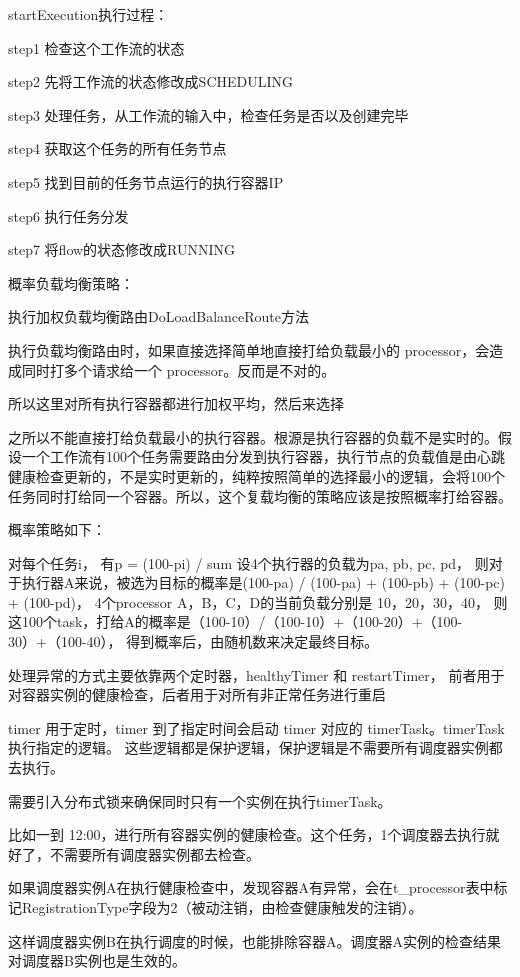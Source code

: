 startExecution执行过程：

step1 检查这个工作流的状态

step2 先将工作流的状态修改成SCHEDULING

step3 处理任务，从工作流的输入中，检查任务是否以及创建完毕

step4 获取这个任务的所有任务节点

step5 找到目前的任务节点运行的执行容器IP

step6 执行任务分发

step7 将flow的状态修改成RUNNING

概率负载均衡策略：

执行加权负载均衡路由DoLoadBalanceRoute方法

执行负载均衡路由时，如果直接选择简单地直接打给负载最小的 processor，会造成同时打多个请求给一个 processor。反而是不对的。

所以这里对所有执行容器都进行加权平均，然后来选择

之所以不能直接打给负载最小的执行容器。根源是执行容器的负载不是实时的。假设一个工作流有100个任务需要路由分发到执行容器，执行节点的负载值是由心跳
健康检查更新的，不是实时更新的，纯粹按照简单的选择最小的逻辑，会将100个任务同时打给同一个容器。所以，这个复载均衡的策略应该是按照概率打给容器。

概率策略如下：

对每个任务i， 有p = (100-pi) / sum
设4个执行器的负载为pa, pb, pc, pd，
则对于执行器A来说，被选为目标的概率是(100-pa) / (100-pa) + (100-pb) + (100-pc) + (100-pd)，
4个processor A，B，C，D的当前负载分别是 10，20，30，40，
则这100个task，打给A的概率是（100-10）/（100-10）+（100-20）+（100-30）+（100-40），
得到概率后，由随机数来决定最终目标。

处理异常的方式主要依靠两个定时器，healthyTimer 和 restartTimer，
前者用于对容器实例的健康检查，后者用于对所有非正常任务进行重启

timer 用于定时，timer 到了指定时间会启动 timer 对应的 timerTask。timerTask 执行指定的逻辑。
这些逻辑都是保护逻辑，保护逻辑是不需要所有调度器实例都去执行\cite{jyfw}。

需要引入分布式锁来确保同时只有一个实例在执行timerTask。

比如一到 12:00，进行所有容器实例的健康检查。这个任务，1个调度器去执行就好了，不需要所有调度器实例都去检查。

如果调度器实例A在执行健康检查中，发现容器A有异常，会在t\_processor表中标记RegistrationType字段为2（被动注销，由检查健康触发的注销）。

这样调度器实例B在执行调度的时候，也能排除容器A。调度器A实例的检查结果对调度器B实例也是生效的。


